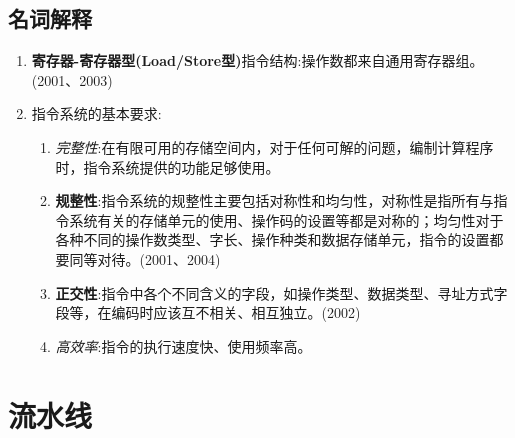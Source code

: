 \documentclass[a4paper]{ctexart}
\begin{document}
\subsection{名词解释}
\begin{enumerate}
  \item \textbf{寄存器-寄存器型(Load/Store型)}指令结构:操作数都来自通用寄存器组。(2001、2003)
  \item 指令系统的基本要求:
  \begin{enumerate}
    \item \emph{完整性}:在有限可用的存储空间内，对于任何可解的问题，编制计算程序时，指令系统提供的功能足够使用。
    \item \textbf{规整性}:指令系统的规整性主要包括对称性和均匀性，对称性是指所有与指令系统有关的存储单元的使用、操作码的设置等都是对称的；均匀性对于各种不同的操作数类型、字长、操作种类和数据存储单元，指令的设置都要同等对待。(2001、2004)
    \item \textbf{正交性}:指令中各个不同含义的字段，如操作类型、数据类型、寻址方式字段等，在编码时应该互不相关、相互独立。(2002)
    \item \emph{高效率}:指令的执行速度快、使用频率高。
  \end{enumerate}

\end{enumerate}

\section{流水线}
\end{document}
